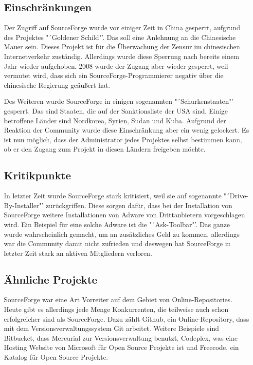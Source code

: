 \documentclass[12pt,a4paper]{article}
\begin{document}
\subsection{Einschr\"ankungen}
Der Zugriff auf SourceForge wurde vor einiger Zeit in China gesperrt, aufgrund des Projektes "´Goldener Schild"'. Das soll eine Anlehnung an die Chinesische Mauer sein. Dieses Projekt ist f\"ur die \"Uberwachung der Zensur im chinesischen Internetverkehr zust\"andig. Allerdings wurde diese Sperrung nach bereits einem Jahr wieder aufgehoben. 2008 wurde der Zugang aber wieder gesperrt, weil vermutet wird, dass sich ein SourceForge-Programmierer negativ \"uber die chinesische Regierung ge\"au{\ss}ert hat. 

Des Weiteren wurde SourceForge in einigen sogenannten "´Schurkenstaaten"' gesperrt. Das sind Staaten, die auf der Sanktionsliste der USA sind. Einige betroffene Länder sind Nordkorea, Syrien, Sudan und Kuba. Aufgrund der Reaktion der Community wurde diese Einschränkung aber ein wenig gelockert. Es ist nun möglich, dass der Administrator jedes Projektes selbst bestimmen kann, ob er den Zugang zum Projekt in diesen Ländern freigeben möchte. 

\subsection{Kritikpunkte}
In letzter Zeit wurde SourceForge stark kritisiert, weil sie auf sogenannte "´Drive-By-Installer"' zurückgriffen. Diese sorgen daf\"ur, dass bei der Installation von SourceForge weitere Installationen von Adware von Drittanbietern vorgeschlagen wird. Ein Beispiel für eine solche Adware ist die "´Ask-Toolbar"'. Das ganze wurde wahrscheinlich gemacht, um an zus\"atzliches Geld zu kommen, allerdings war die Community damit nicht zufrieden und deswegen hat SourceForge in letzter Zeit stark an aktiven Mitgliedern verloren. 

\subsection{\"Ahnliche Projekte}

SourceForge war eine Art Vorreiter auf dem Gebiet von Online-Repositories. Heute gibt es allerdings jede Menge Konkurrenten, die teilweise auch schon erfolgreicher sind als SourceForge. Dazu zählt Github, ein Online-Repository, dass mit dem Versionsverwaltungssystem Git arbeitet. Weitere Beispiele sind Bitbucket, dass Mercurial zur Versionsverwaltung benutzt, Codeplex, was eine Hosting Website von Microsoft für Open Source Projekte ist und Freecode, ein Katalog für Open Source Projekte.
\end{document}
